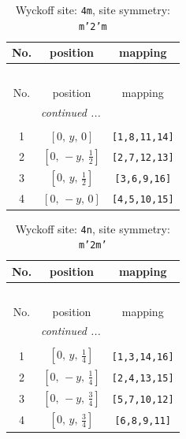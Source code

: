 \documentclass[fleqn,8pt]{jsarticle}
\begin{document}
\renewcommand{\arraystretch}{1.2}
\begin{longtable}{ccc}
\caption{Wyckoff site: {\tt 4m}, site symmetry: {\tt m'2'm}}
 \\
 \hline \hline
No. & position & mapping \\ \hline \endfirsthead

\multicolumn{2}{l}{\tablename\ \thetable{}} \\
 \hline \hline
No. & position & mapping \\ \hline \endhead

 \hline \hline
\multicolumn{2}{r}{\footnotesize\it continued ...} \\ \endfoot

 \hline \hline
\multicolumn{2}{r}{} \\ \endlastfoot

1 & $\left[ 0,\, y,\, 0 \right]$ & {\tt [1,8,11,14]} \\ \hline
2 & $\left[ 0,\, - y,\, \frac{1}{2} \right]$ & {\tt [2,7,12,13]} \\ \hline
3 & $\left[ 0,\, y,\, \frac{1}{2} \right]$ & {\tt [3,6,9,16]} \\ \hline
4 & $\left[ 0,\, - y,\, 0 \right]$ & {\tt [4,5,10,15]} \\
\end{longtable}
\renewcommand{\arraystretch}{1.2}
\begin{longtable}{ccc}
\caption{Wyckoff site: {\tt 4n}, site symmetry: {\tt m'2m'}}
 \\
 \hline \hline
No. & position & mapping \\ \hline \endfirsthead

\multicolumn{2}{l}{\tablename\ \thetable{}} \\
 \hline \hline
No. & position & mapping \\ \hline \endhead

 \hline \hline
\multicolumn{2}{r}{\footnotesize\it continued ...} \\ \endfoot

 \hline \hline
\multicolumn{2}{r}{} \\ \endlastfoot

1 & $\left[ 0,\, y,\, \frac{1}{4} \right]$ & {\tt [1,3,14,16]} \\ \hline
2 & $\left[ 0,\, - y,\, \frac{1}{4} \right]$ & {\tt [2,4,13,15]} \\ \hline
3 & $\left[ 0,\, - y,\, \frac{3}{4} \right]$ & {\tt [5,7,10,12]} \\ \hline
4 & $\left[ 0,\, y,\, \frac{3}{4} \right]$ & {\tt [6,8,9,11]} \\
\end{longtable}
\end{document}

